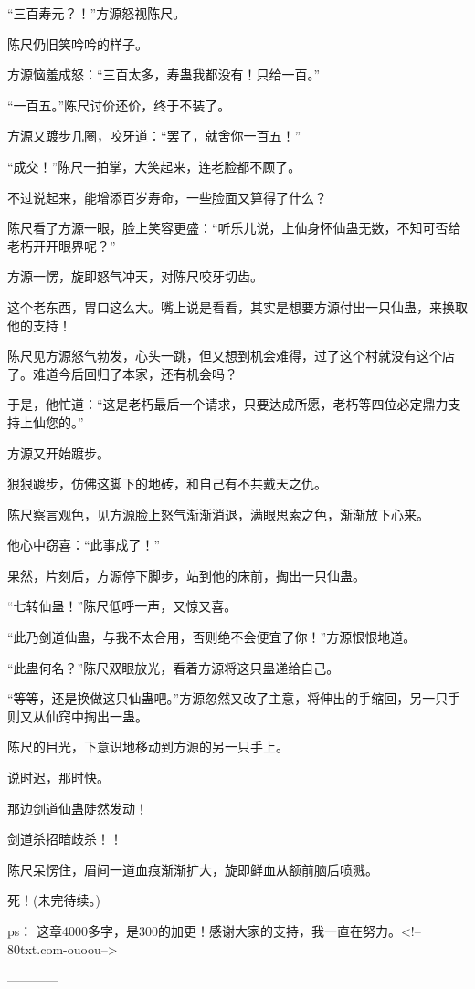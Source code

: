 \begin{this_body}
“三百寿元？！”方源怒视陈尺。

陈尺仍旧笑吟吟的样子。

方源恼羞成怒：“三百太多，寿蛊我都没有！只给一百。”

“一百五。”陈尺讨价还价，终于不装了。

方源又踱步几圈，咬牙道：“罢了，就舍你一百五！”

“成交！”陈尺一拍掌，大笑起来，连老脸都不顾了。

不过说起来，能增添百岁寿命，一些脸面又算得了什么？

陈尺看了方源一眼，脸上笑容更盛：“听乐儿说，上仙身怀仙蛊无数，不知可否给老朽开开眼界呢？”

方源一愣，旋即怒气冲天，对陈尺咬牙切齿。

这个老东西，胃口这么大。嘴上说是看看，其实是想要方源付出一只仙蛊，来换取他的支持！

陈尺见方源怒气勃发，心头一跳，但又想到机会难得，过了这个村就没有这个店了。难道今后回归了本家，还有机会吗？

于是，他忙道：“这是老朽最后一个请求，只要达成所愿，老朽等四位必定鼎力支持上仙您的。”

方源又开始踱步。

狠狠踱步，仿佛这脚下的地砖，和自己有不共戴天之仇。

陈尺察言观色，见方源脸上怒气渐渐消退，满眼思索之色，渐渐放下心来。

他心中窃喜：“此事成了！”

果然，片刻后，方源停下脚步，站到他的床前，掏出一只仙蛊。

“七转仙蛊！”陈尺低呼一声，又惊又喜。

“此乃剑道仙蛊，与我不太合用，否则绝不会便宜了你！”方源恨恨地道。

“此蛊何名？”陈尺双眼放光，看着方源将这只蛊递给自己。

“等等，还是换做这只仙蛊吧。”方源忽然又改了主意，将伸出的手缩回，另一只手则又从仙窍中掏出一蛊。

陈尺的目光，下意识地移动到方源的另一只手上。

说时迟，那时快。

那边剑道仙蛊陡然发动！

剑道杀招暗歧杀！！

陈尺呆愣住，眉间一道血痕渐渐扩大，旋即鲜血从额前脑后喷溅。

死！(未完待续。)

ps：    这章4000多字，是300的加更！感谢大家的支持，我一直在努力。<!--80txt.com-ouoou-->

------------

\end{this_body}

